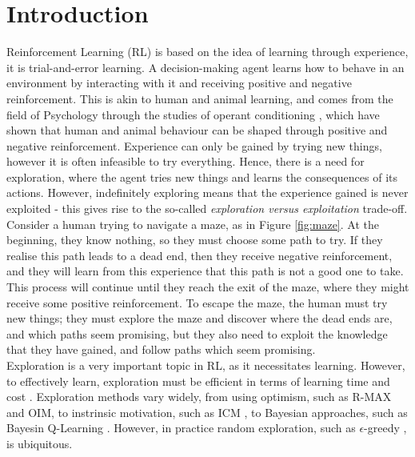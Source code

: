 
\chapter{Introduction}

\label{chapter1}

Reinforcement Learning (RL) \citep{Sutton1998} is based on the idea of learning through experience, it is trial-and-error learning. A decision-making agent learns how to behave in an environment by interacting with it and receiving positive and negative reinforcement. This is akin to human and animal learning, and comes from the field of Psychology through the studies of operant conditioning \citep{nla.cat-vn2770732}, which have shown that human and animal behaviour can be shaped through positive and negative reinforcement. Experience can only be gained by trying new things, however it is often infeasible to try everything. Hence, there is a need for exploration, where the agent tries new things and learns the consequences of its actions. However, indefinitely exploring means that the experience gained is never exploited - this gives rise to the so-called \textit{exploration versus exploitation} trade-off.
\\Consider a human trying to navigate a maze, as in Figure \ref{fig:maze}. At the beginning, they know nothing, so they must choose some path to try. If they realise this path leads to a dead end, then they receive negative reinforcement, and they will learn from this experience that this path is not a good one to take. This process will continue until they reach the exit of the maze, where they might receive some positive reinforcement. To escape the maze, the human must try new things; they must explore the maze and discover where the dead ends are, and which paths seem promising, but they also need to exploit the knowledge that they have gained, and follow paths which seem promising.
\\Exploration is a very important topic in RL, as it necessitates learning. However, to effectively learn, exploration must be efficient in terms of learning time and cost \cite{Thrun-1992-15850}.
Exploration methods vary widely, from  using optimism, such as R-MAX and OIM, to instrinsic motivation, such as ICM \cite{DBLP:journals/corr/PathakAED17}, to Bayesian approaches, such as Bayesin Q-Learning \cite{10.5555/944919.944941}. However, in practice random exploration, such as $\epsilon$-greedy \cite{Watkins:1989, conf/nips/Sutton95}, is ubiquitous.
